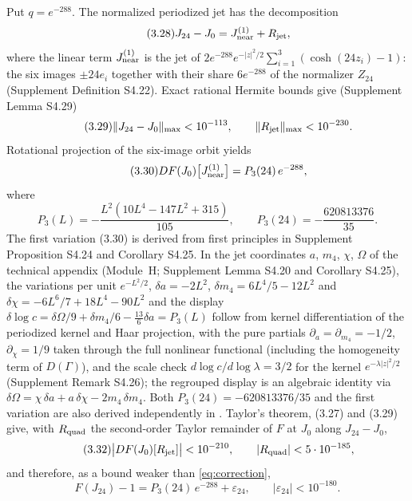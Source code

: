 Put $q=e^{-288}$. The normalized periodized jet has the decomposition
\begin{equation}\tag{3.28}
J_{24}-J_0=J^{(1)}_{\rm near}+R_{\rm jet},
\end{equation}
where the linear term $J^{(1)}_{\rm near}$ is the jet of $2e^{-288}e^{-|z|^2/2}\sum_{i=1}^3(\cosh(24z_i)-1)$: the six images $\pm24e_i$ together with their share $6e^{-288}$ of the normalizer $Z_{24}$ (Supplement Definition S4.22). Exact rational Hermite bounds give (Supplement Lemma S4.29)
\begin{equation}\tag{3.29}
\|J_{24}-J_0\|_{\max}<10^{-113},\qquad \|R_{\rm jet}\|_{\max}<10^{-230}.
\end{equation}
Rotational projection of the six-image orbit yields
\begin{equation}\tag{3.30}
DF(J_0)\bigl[J^{(1)}_{\rm near}\bigr]=P_3(24)\,e^{-288},
\end{equation}
where
\begin{equation}\tag{3.31}
P_3(L)=-\frac{L^2(10L^4-147L^2+315)}{105},\qquad P_3(24)=-\frac{620813376}{35}.
\end{equation}
The first variation (3.30) is derived from first principles in Supplement Proposition S4.24 and Corollary S4.25. In the jet coordinates $a$, $m_4$, $\chi$, $\Omega$ of the technical appendix (Module~H; Supplement Lemma S4.20 and Corollary S4.25), the variations per unit $e^{-L^2/2}$, $\delta a=-2L^2$, $\delta m_4=6L^4/5-12L^2$ and $\delta\chi=-6L^6/7+18L^4-90L^2$ and the display $\delta\log c=\delta\Omega/9+\delta m_4/6-\tfrac{13}{6}\delta a=P_3(L)$ follow from kernel differentiation of the periodized kernel and Haar projection, with the pure partials $\partial_a=\partial_{m_4}=-1/2$, $\partial_\chi=1/9$ taken through the full nonlinear functional (including the homogeneity term of $D(\Gamma)$), and the scale check $d\log c/d\log\lambda=3/2$ for the kernel $e^{-\lambda|z|^2/2}$ (Supplement Remark S4.26); the regrouped display is an algebraic identity via $\delta\Omega=\chi\,\delta a+a\,\delta\chi-2m_4\,\delta m_4$. Both $P_3(24)=-620813376/35$ and the first variation are also derived independently in . Taylor's theorem, (3.27) and (3.29) give, with $R_{\rm quad}$ the second-order Taylor remainder of $F$ at $J_0$ along $J_{24}-J_0$,
\begin{equation}\tag{3.32}
\bigl|DF(J_0)[R_{\rm jet}]\bigr|<10^{-210},\qquad |R_{\rm quad}|<5\cdot10^{-185},
\end{equation}
and therefore, as a bound weaker than \eqref{eq:correction},
\begin{equation}\tag{3.33}
F(J_{24})-1=P_3(24)\,e^{-288}+\varepsilon_{24},\qquad |\varepsilon_{24}|<10^{-180}.
\end{equation}

